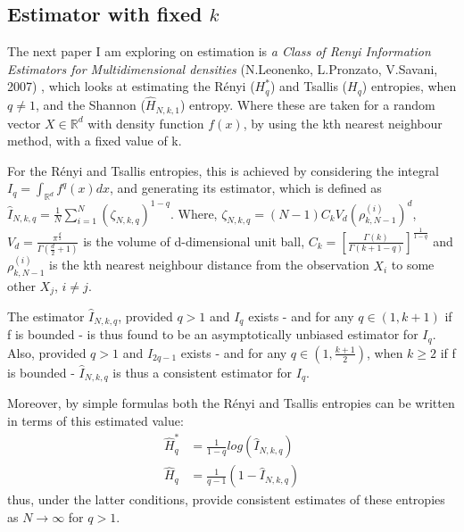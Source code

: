 \documentclass[12pt]{report}
\begin{document}
\subsection{Estimator with fixed $k$} \label{fixed_k}

The next paper I am exploring on estimation is \textit{a Class of Renyi Information Estimators for Multidimensional densities} (N.Leonenko, L.Pronzato, V.Savani, 2007) \cite{paper2}, which looks at estimating the R\'enyi ($H_{q}^{*}$) and Tsallis ($H_{q}$) entropies, when $q \neq 1$, and the Shannon ($\hat{H}_{N, k, 1}$) entropy. Where these are taken for a random vector $X \in \mathbb{R}^d$ with density function $f(x)$, by using the kth nearest neighbour method, with a fixed value of k. 

For the R\'enyi and Tsallis entropies, this is achieved by considering the integral  $I_{q} = \int_{\mathbb{R}^d} f^q (x) dx$, and generating its estimator, which is defined as $\hat{I}_{N, k, q} = \frac{1}{N} \sum_{i=1}^{N} (\zeta_{N, k, q})^{1-q}$. Where, $\zeta_{N, k ,q} = (N-1)C_{k}V_{d}(\rho_{k, N-1}^{(i)})^d$,  $V_{d} = \frac{\pi^{\frac{d}{2}}}{\Gamma(\frac{d}{2} + 1 )}$ is the volume of d-dimensional unit ball, $C_{k} = \left[ \frac{\Gamma(k)}{\Gamma(k+1-q)} \right]^{\frac{1}{1-q}}$ and $\rho_{k, N-1}^{(i)}$ is the kth nearest neighbour distance from the observation $X_{i}$ to some other $X_{j}$, $i \neq j$.

The estimator $\hat{I}_{N, k, q}$, provided $q>1$ and $I_{q}$ exists - and for any $q \in (1, k+1)$ if f is bounded - is thus found to be an asymptotically unbiased estimator for $I_{q}$. Also, provided  $q>1$ and $I_{2q-1}$ exists -  and for any $q \in (1, \frac{k+1}{2})$, when $k \geq 2$ if f is bounded - $\hat{I}_{N, k, q}$ is thus a consistent estimator for $I_{q}$.

Moreover, by simple formulas both the R\'enyi and Tsallis entropies can be written in terms of this estimated value:
\begin{align}
\hat{H}_{q}^{*} &= \frac{1}{1-q} log(\hat{I}_{N, k, q}) \\
\hat{H}_{q} &= \frac{1}{q-1} (1 - \hat{I}_{N, k, q})
\end{align}
thus, under the latter conditions, provide consistent estimates of these entropies as $N \to \infty$ for $q > 1$.
\end{document}
